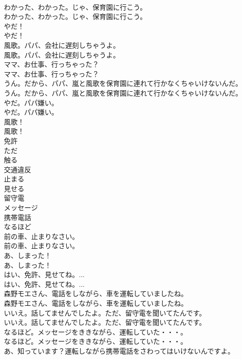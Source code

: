 \documentclass[8pt]{extreport}
\begin{document}
\begin{CJK}{UTF8}{min}
\\	わかった、わかった。じゃ、保育園に行こう。	
\\	わかった、わかった。じゃ、保育園に行こう。 
\\	やだ！	
\\	やだ！ 
\\	風歌。パパ、会社に遅刻しちゃうよ。	
\\	風歌。パパ、会社に遅刻しちゃうよ。 
\\	ママ、お仕事、行っちゃった？	
\\	ママ、お仕事、行っちゃった？ 
\\	うん。だから、パパ、嵐と風歌を保育園に連れて行かなくちゃいけないんだ。	
\\	うん。だから、パパ、嵐と風歌を保育園に連れて行かなくちゃいけないんだ。 
\\	やだ。パパ嫌い。	
\\	やだ。パパ嫌い。 
\\	風歌！	
\\	風歌！ 
\\	免許
\\	ただ
\\	触る
\\	交通違反
\\	止まる
\\	見せる
\\	留守電
\\	メッセージ
\\	携帯電話
\\	なるほど
\\	前の車、止まりなさい。	
\\	前の車、止まりなさい。 
\\	あ、しまった！	
\\	あ、しまった！ 
\\	はい、免許、見せてね。...	
\\	はい、免許、見せてね。... 
\\	森野モエさん、電話をしながら、車を運転していましたね。	
\\	森野モエさん、電話をしながら、車を運転していましたね。 
\\	いいえ。話してませんでしたよ。ただ、留守電を聞いてたんです。	
\\	いいえ。話してませんでしたよ。ただ、留守電を聞いてたんです。 
\\	なるほど。メッセージをききながら、運転していた・・・。	
\\	なるほど。メッセージをききながら、運転していた・・・。 
\\	あ、知っています？運転しながら携帯電話をさわってはいけないんですよ。	

\end{CJK}
\end{document}
